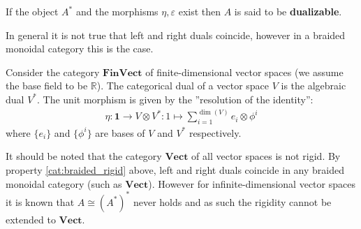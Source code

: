 {        If the object $A^*$ and the morphisms $\eta, \varepsilon$ exist then $A$ is said to be \textbf{dualizable}.
    }


    \begin{property}\label{cat:braided_rigid}
        In general it is not true that left and right duals coincide, however in a braided monoidal category this is the case.
    \end{property}

    \begin{example}[FinVect]
        Consider the category $\mathbf{FinVect}$ of finite-dimensional vector spaces (we assume the base field to be $\mathbb{R}$). The categorical dual of a vector space $V$ is the algebraic dual $V^*$. The unit morphism is given by the ''resolution of the identity'':
        \begin{gather}
            \eta: \mathbf{1}\rightarrow V\otimes V^*:1\mapsto\sum_{i=1}^{\dim(V)}e_i\otimes \phi^i
        \end{gather}
        where $\{e_i\}$ and $\{\phi^i\}$ are bases of $V$ and $V^*$ respectively.

        It should be noted that the category $\mathbf{Vect}$ of all vector spaces is not rigid. By property \ref{cat:braided_rigid} above, left and right duals coincide in any braided monoidal category (such as $\mathbf{Vect}$). However for infinite-dimensional vector spaces it is known that $A\cong(A^*)^*$ never holds and as such the rigidity cannot be extended to $\mathbf{Vect}$.
    \end{example}

